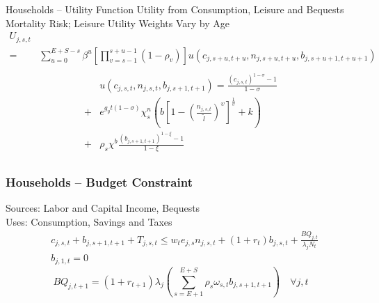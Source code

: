 \documentclass{beamer}
\begin{document}
  \begin{frame}{Households -- Utility Function}\label{Utility Function}
    Utility from Consumption, Leisure and Bequests \\
    Mortality Risk;  Leisure Utility Weights Vary by Age
    \begin{equation}
      \begin{split}
        U_{j,s,t} \\
        = & \sum_{u=0}^{E+S-s}\beta^u\left[\prod_{v=s-1}^{s+u-1}(1-\rho_v)\right] u\left(c_{j,s+u,t+u},n_{j,s+u,t+u},b_{j,s+u+1,t+u+1}\right) \nonumber \\
      \end{split}
    \end{equation}
    \begin{equation}
      \begin{split}
        & u\left(c_{j,s,t},n_{j,s,t},b_{j,s+1,t+1}\right) = \frac{\left(c_{j,s,t}\right)^{1-\sigma} - 1}{1-\sigma} \\
        + & e^{g_y t(1-\sigma)}\chi^n_s\left(b\left[1 - \left(\frac{n_{j,s,t}}{\tilde{l}}\right)^\upsilon\right]^\frac{1}{\upsilon} + k\right) \\
        + & \rho_s\chi^b\frac{\left(b_{j,s+1,t+1}\right)^{1-\xi} - 1}{1-\xi} \nonumber \\
      \end{split}
    \end{equation}
    \hyperlink{elliptic}{}
  \end{frame}

  \begin{frame}
    \frametitle{Households -- Budget Constraint}
    Sources: Labor and Capital Income, Bequests \\
    Uses: Consumption, Savings and Taxes
    \begin{equation}
      \begin{split}
        & c_{j,s,t} + b_{j,s+1,t+1} + T_{j,s,t} \leq  w_t e_{j,s}n_{j,s,t} + \left(1 + r_t\right) b_{j,s,t} + \frac{BQ_{j,t}}{\lambda_jN_t}  \\
        & b_{j,1,t} = 0  \nonumber
      \end{split}
    \end{equation}
    \begin{equation}
      BQ_{j,t+1} = (1+r_{t+1})\lambda_j\left(\sum_{s=E+1}^{E+S}\rho_s\omega_{s,t}b_{j,s+1,t+1}\right) \quad\forall j,t \nonumber
    \end{equation}
  \end{frame}
\end{document}
